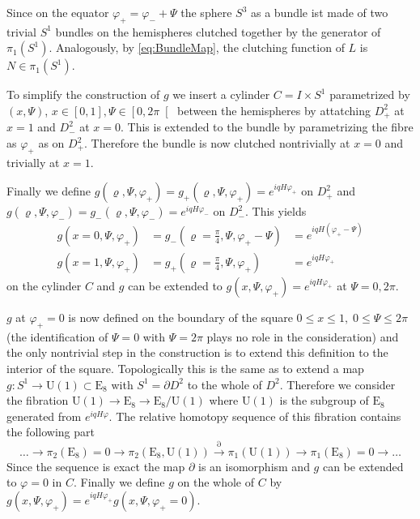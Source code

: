 \documentclass[a4paper,12pt,twoside]{article}
\numberwithin{equation}{section}
\let\rho\varrho
\let\phi\varphi
\newcommand{\pU}{\text{U}  }     %
\newcommand{\pE}{\text{E}  }     %
\newcommand{\Dp}{\partial}      %
\newcommand{\auf}{\rightarrow}
\newcommand{\lauf}{\longrightarrow}
\begin{document}
Since on the equator $\phi_+ = \phi_- + \Psi$ the sphere $S^3$ as a
bundle ist made of two trivial $S^1$ bundles on the hemispheres
clutched together by the generator of $\pi_1(S^1)$. Analogously, by
\eqref{eq:BundleMap}, the clutching function of $L$ is $N \in
\pi_1(S^1)$.

To simplify the construction of $g$ we insert a cylinder $C = I \times
S^1$ parametrized by $(x,\Psi)$, $x \in [0 , 1], \Psi \in \left[ 0,
  2\pi \right[$ between the hemispheres by attatching $D^2_+$ at $x=1$
and $D^2_-$ at $x=0$.  This is extended to the bundle by parametrizing
the fibre as $\phi_+$ as on $D^2_+$. Therefore the bundle is now
clutched nontrivially at $x=0$ and trivially at $x=1$.

Finally we define $g(\rho,\Psi,\phi_+) = g_+(\rho,\Psi,\phi_+) =
e^{iqH\phi_+}$ on $D^2_+$ and $g(\rho,\Psi,\phi_-) =
g_-(\rho,\Psi,\phi_-) = e^{iqH\phi_-}$ on $D^2_-$.  This yields
\begin{equation}
  \begin{array}{lll}
    g(x=0,\Psi,\phi_+)
    &= g_-(\rho=\tfrac{\pi}{4},\Psi,\phi_+ - \Psi)
    &= e^{iqH(\phi_+ - \Psi)} \\
    g(x=1,\Psi,\phi_+)
    &= g_+(\rho=\tfrac{\pi}{4},\Psi,\phi_+)
    &= e^{iqH\phi_+}
  \end{array}
\end{equation}
on the cylinder $C$ and $g$ can be extended to $g(x, \Psi, \phi_+) =
e^{iqH\phi_+}$ at $\Psi=0,2\pi$.

$g$ at $\phi_+=0$ is now defined on the boundary of the square $0\leq
x \leq 1, \; 0 \leq \Psi \leq 2\pi$ (the identification of $\Psi=0$
with $\Psi=2\pi$ plays no role in the consideration) and the only
nontrivial step in the construction is to extend this definition to
the interior of the square. Topologically this is the same as to
extend a map $g : S^1 \auf \pU(1) \subset \pE_8$ with $S^1 = \Dp D^2$
to the whole of $D^2$. Therefore we consider the fibration $\pU(1)
\lauf \pE_8 \lauf \pE_8/\pU(1)$ where $\pU(1)$ is the subgroup of
$\pE_8$ generated from $e^{iqH\phi}$. The relative homotopy sequence
of this fibration contains the following part
\begin{equation}
  \label{eq:RelHom}
  \ldots \lauf \pi_2(\pE_8) = 0 \lauf \pi_2 (\pE_8, \pU(1))
  \overset{\Dp}{\lauf}
  \pi_1(\pU(1)) \lauf \pi_1(\pE_8) = 0 \lauf \ldots
\end{equation}
Since the sequence is exact the map $\Dp$ is an isomorphism and $g$
can be extended to $\phi=0$ in $C$. Finally we define $g$ on the whole
of $C$ by $g(x,\Psi,\phi_+) = e^{iqH\phi_+} g(x,\Psi,\phi_+=0)$.
\end{document}
